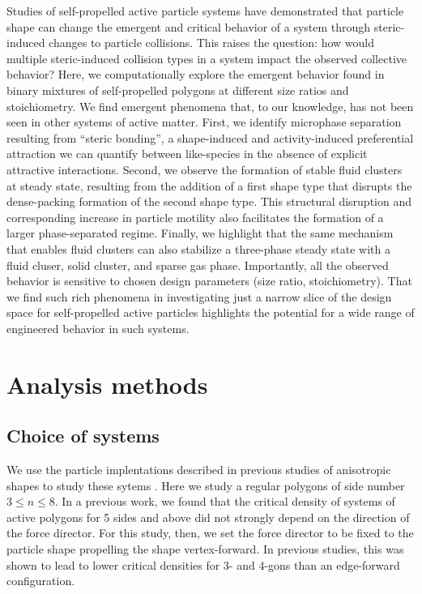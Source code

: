 

Studies of self-propelled active particle systems have demonstrated that particle shape can change the emergent and critical behavior of a system through steric-induced changes to particle collisions.
This raises the question: how would multiple steric-induced collision types in a system impact the observed collective behavior?
Here, we computationally explore the emergent behavior found in binary mixtures of self-propelled polygons at different size ratios and stoichiometry.
We find emergent phenomena that, to our knowledge, has not been seen in other systems of active matter.
First, we identify microphase separation resulting from ``steric bonding'', a shape-induced and activity-induced preferential attraction we can quantify between like-species in the absence of explicit attractive interactions.
Second, we observe the formation of stable fluid clusters at steady state, resulting from the addition of a first shape type that disrupts the dense-packing formation of the second shape type.
This structural disruption and corresponding increase in particle motility also facilitates the formation of a larger phase-separated regime.
Finally, we highlight that the same mechanism that enables fluid clusters can also stabilize a three-phase steady state with a fluid cluser, solid cluster, and sparse gas phase.
Importantly, all the observed behavior is sensitive to chosen design parameters (size ratio, stoichiometry).
That we find such rich phenomena in investigating just a narrow slice of the design space for self-propelled active particles highlights the potential for a wide range of engineered behavior in such systems.


\section{Analysis methods}

\subsection{Choice of systems}
We use the particle implentations described in previous studies of anisotropic shapes to study these sytems \cite{active_shapes}.
Here we study a regular polygons of side number $3{\leq}n{\leq}8$.
In a previous work\cite{active_shapes}, we found that the critical density of systems of active polygons for 5 sides and above did not strongly depend on the direction of the force director.
For this study, then, we set the force director to be fixed to the particle shape propelling the shape vertex-forward.
In previous studies, this was shown to lead to lower critical densities for 3- and 4-gons than an edge-forward configuration.

